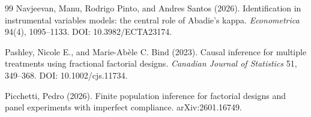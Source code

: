 \documentclass{article}
\begin{document}
\begin{thebibliography}{99}
   Navjeevan, Manu, Rodrigo Pinto, and Andres Santos (2026). Identification in instrumental variables models: the central role of Abadie's kappa. \emph{Econometrica} 94(4), 1095--1133. DOI: 10.3982/ECTA23174.

   Pashley, Nicole E., and Marie-Abèle C. Bind (2023). Causal inference for multiple treatments using fractional factorial designs. \emph{Canadian Journal of Statistics} 51, 349--368. DOI: 10.1002/cjs.11734.

   Picchetti, Pedro (2026). Finite population inference for factorial designs and panel experiments with imperfect compliance. arXiv:2601.16749.

\end{thebibliography}
\end{document}
